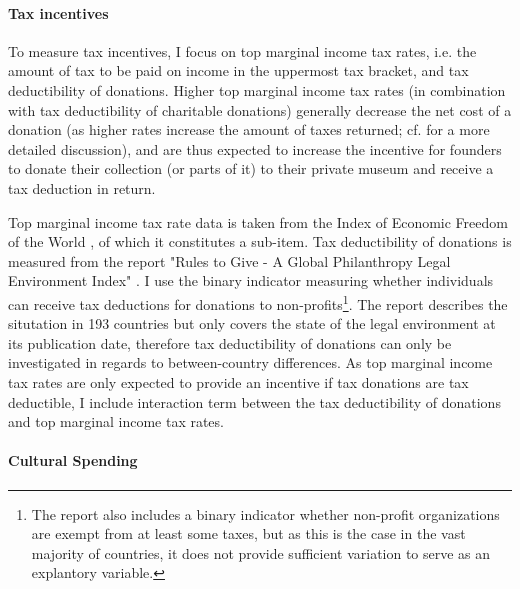 \documentclass[11pt]{article}
\begin{document}
\paragraph*{Tax incentives}

To measure tax incentives, I focus on top marginal income tax rates, i.e. the amount of tax to be paid on income in the uppermost tax bracket, and tax deductibility of donations.
Higher top marginal income tax rates (in combination with tax deductibility of charitable donations) generally decrease the net cost of a donation (as higher rates increase the amount of taxes returned; cf. \cite{Hemels_2017_incentives} for a more detailed discussion), and are thus expected to increase the incentive for founders to donate their collection (or parts of it) to their private museum and receive a tax deduction in return. 


Top marginal income tax rate data is taken from the Index of Economic Freedom of the World \parencite{Fraser_2022_economic_freedom}, of which it constitutes a sub-item.
Tax deductibility of donations is measured from the report "Rules to Give - A Global Philanthropy Legal Environment Index" \parencite{Quick_Kruse_Pickering_2014_philanthropy}.
I use the binary indicator measuring whether individuals can receive tax deductions for donations to non-profits\footnote{The report also includes a binary indicator whether non-profit organizations are exempt from at least some taxes, but as this is the case in the vast majority of countries, it does not provide sufficient variation to serve as an explantory variable.}.
The report describes the situtation in 193 countries but only covers the state of the legal environment at its publication date, therefore tax deductibility of donations can only be investigated in regards to between-country differences.
As top marginal income tax rates are only expected to provide an incentive if tax donations are tax deductible, I include interaction term between the tax deductibility of donations and top marginal income tax rates. 

\paragraph*{Cultural Spending}
\end{document}
